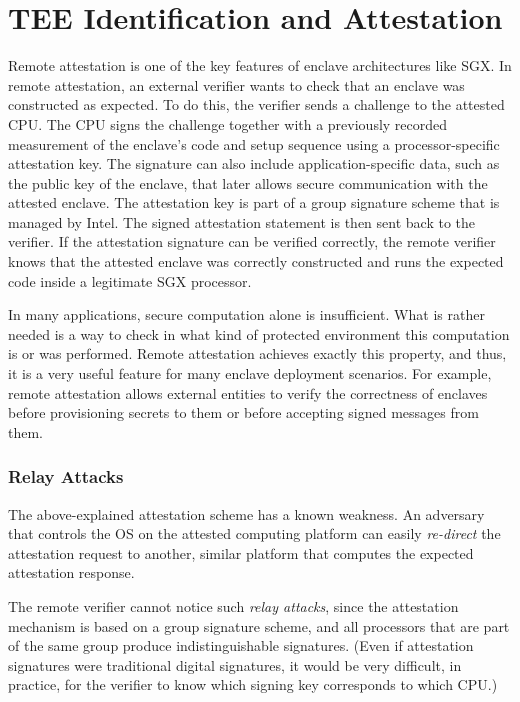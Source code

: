 
\section*{TEE Identification and Attestation}

Remote attestation is one of the key features of enclave architectures like SGX. In remote attestation, an external verifier wants to check that an enclave was constructed as expected. To do this, the verifier sends a challenge to the attested CPU. The CPU signs the challenge together with a previously recorded measurement of the enclave's code and setup sequence using a processor-specific attestation key. The signature can also include application-specific data, such as the public key of the enclave, that later allows secure communication with the attested enclave. The attestation key is part of a group signature scheme that is managed by Intel. The signed attestation statement is then sent back to the verifier. If the attestation signature can be verified correctly, the remote verifier knows that the attested enclave was correctly constructed and runs the expected code inside a legitimate SGX processor. 

In many applications, secure computation alone is insufficient. What is rather needed is a way to check in what kind of protected environment this computation is or was performed. Remote attestation achieves exactly this property, and thus, it is a very useful feature for many enclave deployment scenarios. For example, remote attestation allows external entities to verify the correctness of enclaves before provisioning secrets to them or before accepting signed messages from them.  

\subsubsection*{Relay Attacks}

The above-explained attestation scheme has a known weakness. %
An adversary that controls the OS on the attested computing platform can easily \emph{re-direct} the attestation request to another, similar platform that computes the expected attestation response. 

The remote verifier cannot notice such \emph{relay attacks}, since the attestation mechanism is based on a group signature scheme, and all processors that are part of the same group produce indistinguishable signatures. (Even if attestation signatures were traditional digital signatures, it would be very difficult, in practice, for the verifier to know which signing key corresponds to which CPU.) 


